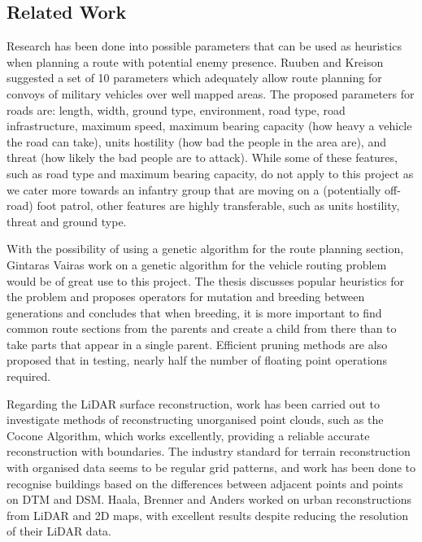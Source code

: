 \documentclass[12pt,a4paper]{article}
\begin{document}
  \subsection{Related Work}
  \noindent Research has been done into possible parameters that can be used as heuristics when planning a route with potential enemy presence. Ruuben and Kreison suggested a set of 10 parameters which adequately allow route planning for convoys of military vehicles over well mapped areas. \citeyear{ruuben2013route} The proposed parameters for roads are: length, width, ground type, environment, road type, road infrastructure, maximum speed, maximum bearing capacity (how heavy a vehicle the road can take), units hostility (how bad the people in the area are), and threat (how likely the bad people are to attack). While some of these features, such as road type and maximum bearing capacity, do not apply to this project as we cater more towards an infantry group that are moving on a (potentially off-road) foot patrol, other features are highly transferable, such as units hostility, threat and ground type.
  \par With the possibility of using a genetic algorithm for the route planning section, Gintaras Vaira\textquotesingle s work on a genetic algorithm for the vehicle routing problem would be of great use to this project. The thesis discusses popular heuristics for the problem and proposes operators for mutation and breeding between generations and concludes that when breeding, it is more important to find common route sections from the parents and create a child from there than to take parts that appear in a single parent. Efficient pruning methods are also proposed that in testing, nearly half the number of floating point operations required. \cite{vaira2014genetic}
  \par Regarding the LiDAR surface reconstruction, work has been carried out to investigate methods of reconstructing unorganised point clouds, such as the Cocone Algorithm, \cite{DEY2011483} which works excellently, providing a reliable accurate reconstruction with boundaries. The industry standard for terrain reconstruction with organised data seems to be regular grid patterns, and work has been done to recognise buildings based on the differences between adjacent points and points on DTM and DSM. Haala, Brenner and Anders worked on urban reconstructions from LiDAR and 2D maps, with excellent results despite reducing the resolution of their LiDAR data. \citeyear{haala19983d}
\end{document}
